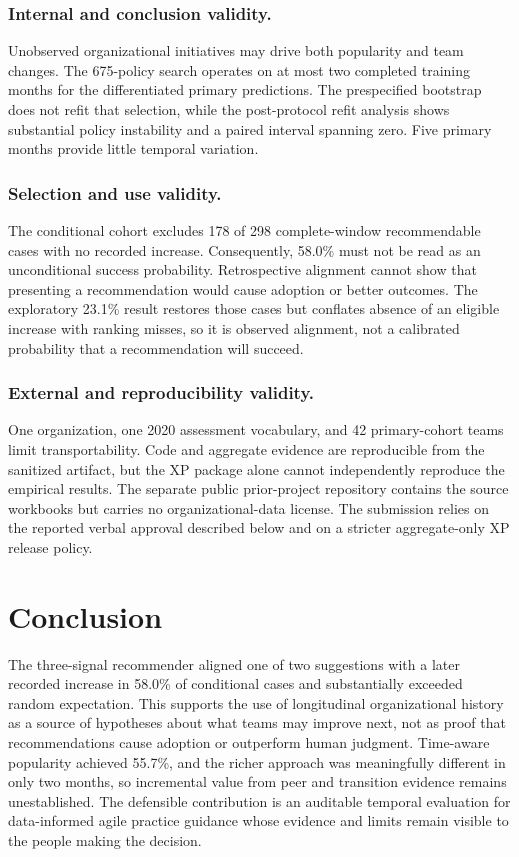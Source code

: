 \documentclass[runningheads]{llncs}
\begin{document}
\subsubsection{Internal and conclusion validity.} Unobserved organizational initiatives may drive both popularity and team changes. The 675-policy search operates on at most two completed training months for the differentiated primary predictions. The prespecified bootstrap does not refit that selection, while the post-protocol refit analysis shows substantial policy instability and a paired interval spanning zero. Five primary months provide little temporal variation.

\subsubsection{Selection and use validity.} The conditional cohort excludes 178 of 298 complete-window recommendable cases with no recorded increase. Consequently, 58.0\% must not be read as an unconditional success probability. Retrospective alignment cannot show that presenting a recommendation would cause adoption or better outcomes. The exploratory 23.1\% result restores those cases but conflates absence of an eligible increase with ranking misses, so it is observed alignment, not a calibrated probability that a recommendation will succeed.

\subsubsection{External and reproducibility validity.} One organization, one 2020 assessment vocabulary, and 42 primary-cohort teams limit transportability. Code and aggregate evidence are reproducible from the sanitized artifact, but the XP package alone cannot independently reproduce the empirical results. The separate public prior-project repository contains the source workbooks but carries no organizational-data license. The submission relies on the reported verbal approval described below and on a stricter aggregate-only XP release policy.

\section{Conclusion}

The three-signal recommender aligned one of two suggestions with a later recorded increase in 58.0\% of conditional cases and substantially exceeded random expectation. This supports the use of longitudinal organizational history as a source of hypotheses about what teams may improve next, not as proof that recommendations cause adoption or outperform human judgment. Time-aware popularity achieved 55.7\%, and the richer approach was meaningfully different in only two months, so incremental value from peer and transition evidence remains unestablished. The defensible contribution is an auditable temporal evaluation for data-informed agile practice guidance whose evidence and limits remain visible to the people making the decision.
\end{document}
